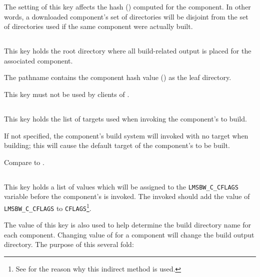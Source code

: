 The setting of this key affects the hash ()
computed for the component.  In other words, a downloaded component's
set of directories will be disjoint from the set of directories used
if the same component were actually built.


\subsection{}\label{variables:build-root-directory}

This key holds the root directory where all build-related output is
placed for the associated component.

The pathname contains the component hash value ()
as the leaf directory.

This key must not be used by clients of \lmsbw.


\subsection{}\label{variables:build-target}

This key holds the list of targets used when invoking the component's
\makefile to build.

If not specified, the component's build system will invoked with no
target when building; this will cause the default target of the
component's \makefile to be built.

Compare to .


\subsection{}\label{variables:cflags}

This key holds a list of values which will be assigned to the
\texttt{LMSBW\_C\_CFLAGS} variable before the component's \makefile is
invoked.  The invoked \makefile should add the value of
\texttt{LMSBW\_C\_CFLAGS} to \texttt{CFLAGS}\footnote{See
   for the reason why this indirect method is used.}.

The value of this key is also used to help determine the build
directory name for each component.  Changing value of
 for a component will change the build
output directory. The purpose of this several fold:

